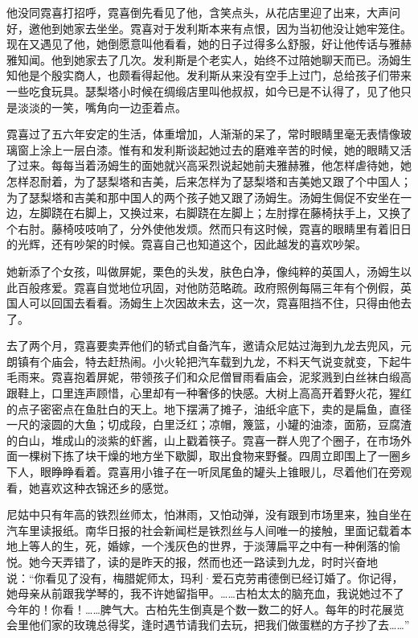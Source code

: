 \par 他没同霓喜打招呼，霓喜倒先看见了他，含笑点头，从花店里迎了出来，大声问好，邀他到她家去坐坐。霓喜对于发利斯本来有点恨，因为当初他没让她牢笼住。现在又遇见了他，她倒愿意叫他看看，她的日子过得多么舒服，好让他传话与雅赫雅知闻。他到她家去了几次。发利斯是个老实人，始终不过陪她聊天而已。汤姆生知他是个殷实商人，也颇看得起他。发利斯从来没有空手上过门，总给孩子们带来一些吃食玩具。瑟梨塔小时候在绸缎店里叫他叔叔，如今已是不认得了，见了他只是淡淡的一笑，嘴角向一边歪着点。
\par 霓喜过了五六年安定的生活，体重增加，人渐渐的呆了，常时眼睛里毫无表情像玻璃窗上涂上一层白漆。惟有和发利斯谈起她过去的磨难辛苦的时候，她的眼睛又活了过来。每每当着汤姆生的面她就兴高采烈说起她前夫雅赫雅，他怎样虐待她，她怎样忍耐着，为了瑟梨塔和吉美，后来怎样为了瑟梨塔和吉美她又跟了个中国人；为了瑟梨塔和吉美和那中国人的两个孩子她又跟了汤姆生。汤姆生侷促不安坐在一边，左脚跷在右脚上，又换过来，右脚跷在左脚上；左肘撑在藤椅扶手上，又换了个右肘。藤椅吱吱响了，分外使他发烦。然而只有这时候，霓喜的眼睛里有着旧日的光辉，还有吵架的时候。霓喜自己也知道这个，因此越发的喜欢吵架。
\par 她新添了个女孩，叫做屏妮，栗色的头发，肤色白净，像纯粹的英国人，汤姆生以此百般疼爱。霓喜自觉地位巩固，对他防范略疏。政府照例每隔三年有个例假，英国人可以回国去看看。汤姆生上次因故未去，这一次，霓喜阻挡不住，只得由他去了。
\par 去了两个月，霓喜要卖弄他们的轿式自备汽车，邀请众尼姑过海到九龙去兜风，元朗镇有个庙会，特去赶热闹。小火轮把汽车载到九龙，不料天气说变就变，下起牛毛雨来。霓喜抱着屏妮，带领孩子们和众尼僧冒雨看庙会，泥浆溅到白丝袜白缎高跟鞋上，口里连声顾惜，心里却有一种奢侈的快感。大树上高高开着野火花，猩红的点子密密点在鱼肚白的天上。地下摆满了摊子，油纸伞底下，卖的是扁鱼，直径一尺的滚圆的大鱼；切成段，白里泛红；凉帽，篾篮，小罐的油漆，面筋，豆腐渣的白山，堆成山的淡紫的虾酱，山上戳着筷子。霓喜一群人兜了个圈子，在市场外面一棵树下拣了块干燥的地方坐下歇脚，取出食物来野餐。四周立即围上了一圈乡下人，眼睁睁看着。霓喜用小锥子在一听凤尾鱼的罐头上锥眼儿，尽着他们在旁观看，她喜欢这种衣锦还乡的感觉。
\par 尼姑中只有年高的铁烈丝师太，怕淋雨，又怕动弹，没有跟到市场里来，独自坐在汽车里读报纸。南华日报的社会新闻栏是铁烈丝与人间唯一的接触，里面记载着本地上等人的生，死，婚嫁，一个浅灰色的世界，于淡薄扁平之中有一种俐落的愉悦。她今天弄错了，读的是昨天的报，然而也还一路读到九龙，时时兴奋地说：“你看见了没有，梅腊妮师太，玛利·爱石克劳甫德倒已经订婚了。你记得，她母亲从前跟我学琴的，我不许她留指甲。……古柏太太的脑充血，我说她过不了今年的！你看！……脾气大。古柏先生倒真是个数一数二的好人。每年的时花展览会里他们家的玫瑰总得奖，逢时遇节请我们去玩，把我们做蛋糕的方子抄了去……”
